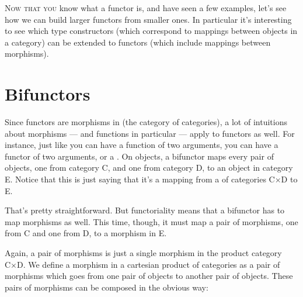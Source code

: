 \lettrine[lhang=0.17]{N}{ow that you} know what a functor is, and have seen a few examples, let's
see how we can build larger functors from smaller ones. In particular
it's interesting to see which type constructors (which correspond to
mappings between objects in a category) can be extended to functors
(which include mappings between morphisms).

\section{Bifunctors}\label{bifunctors}

Since functors are morphisms in  (the category of categories),
a lot of intuitions about morphisms --- and functions in particular ---
apply to functors as well. For instance, just like you can have a
function of two arguments, you can have a functor of two arguments, or a
. On objects, a bifunctor maps every pair of objects,
one from category C, and one from category D, to an object in category
E. Notice that this is just saying that it's a mapping from a
 of categories C×D to E.

\begin{figure}
\centering
{}
\end{figure}

\noindent
That's pretty straightforward. But functoriality means that a bifunctor
has to map morphisms as well. This time, though, it must map a pair of
morphisms, one from C and one from D, to a morphism in E.

Again, a pair of morphisms is just a single morphism in the product
category C×D. We define a morphism in a cartesian product of categories
as a pair of morphisms which goes from one pair of objects to another
pair of objects. These pairs of morphisms can be composed in the obvious
way:

